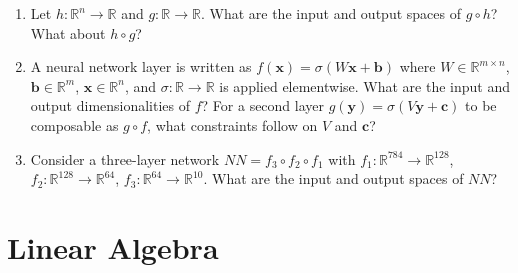 \documentclass[12pt, a4paper]{scrartcl}
\begin{document}
\begin{enumerate}
    \item Let $h: \mathbb{R}^n \to \mathbb{R}$ and $g: \mathbb{R} \to
    \mathbb{R}$. What are the input and output spaces of $g \circ h$? What
    about $h \circ g$?

    \item A neural network layer is written as $f(\mathbf{x}) = \sigma(W\mathbf{x}
    + \mathbf{b})$ where $W \in \mathbb{R}^{m \times n}$, $\mathbf{b} \in
    \mathbb{R}^m$, $\mathbf{x} \in \mathbb{R}^n$, and $\sigma: \mathbb{R} \to
    \mathbb{R}$ is applied elementwise. What are the input and output
    dimensionalities of $f$? For a second layer $g(\mathbf{y}) =
    \sigma(V\mathbf{y} + \mathbf{c})$ to be composable as $g \circ f$, what
    constraints follow on $V$ and $\mathbf{c}$?

    \item Consider a three-layer network $NN = f_3 \circ f_2 \circ f_1$ with
    $f_1: \mathbb{R}^{784} \to \mathbb{R}^{128}$, $f_2: \mathbb{R}^{128} \to
    \mathbb{R}^{64}$, $f_3: \mathbb{R}^{64} \to \mathbb{R}^{10}$. What are
    the input and output spaces of $NN$?

\end{enumerate}

\section{Linear Algebra}
\end{document}
